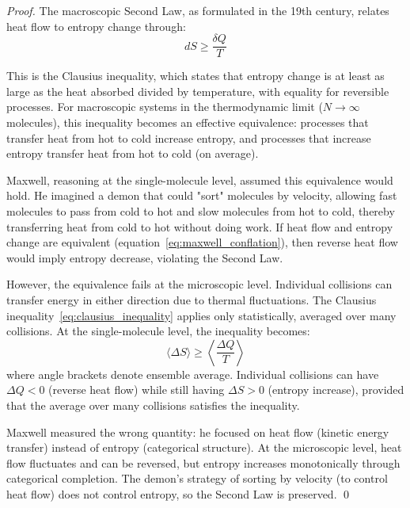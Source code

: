 \documentclass[12pt,a4paper]{article}
\theoremstyle{definition}
\theoremstyle{remark}
\begin{document}
\begin{proof}
The macroscopic Second Law, as formulated in the 19th century, relates heat flow to entropy change through:
\begin{equation}
dS \geq \frac{\delta Q}{T}
\label{eq:clausius_inequality}
\end{equation}

This is the Clausius inequality, which states that entropy change is at least as large as the heat absorbed divided by temperature, with equality for reversible processes. For macroscopic systems in the thermodynamic limit ($N \to \infty$ molecules), this inequality becomes an effective equivalence: processes that transfer heat from hot to cold increase entropy, and processes that increase entropy transfer heat from hot to cold (on average).

Maxwell, reasoning at the single-molecule level, assumed this equivalence would hold. He imagined a demon that could "sort" molecules by velocity, allowing fast molecules to pass from cold to hot and slow molecules from hot to cold, thereby transferring heat from cold to hot without doing work. If heat flow and entropy change are equivalent (equation~\eqref{eq:maxwell_conflation}), then reverse heat flow would imply entropy decrease, violating the Second Law.

However, the equivalence fails at the microscopic level. Individual collisions can transfer energy in either direction due to thermal fluctuations. The Clausius inequality~\eqref{eq:clausius_inequality} applies only statistically, averaged over many collisions. At the single-molecule level, the inequality becomes:
\begin{equation}
\langle \Delta S \rangle \geq \left\langle \frac{\Delta Q}{T} \right\rangle
\end{equation}
where angle brackets denote ensemble average. Individual collisions can have $\Delta Q < 0$ (reverse heat flow) while still having $\Delta S > 0$ (entropy increase), provided that the average over many collisions satisfies the inequality.

Maxwell measured the wrong quantity: he focused on heat flow (kinetic energy transfer) instead of entropy (categorical structure). At the microscopic level, heat flow fluctuates and can be reversed, but entropy increases monotonically through categorical completion. The demon's strategy of sorting by velocity (to control heat flow) does not control entropy, so the Second Law is preserved. \qed
\end{proof}
\end{document}
